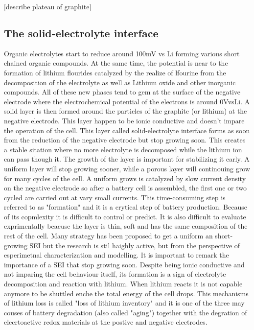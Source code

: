 [describe plateau of graphite]

\subsection{The solid-electrolyte interface}

Organic electrolytes start to reduce around 100mV vs Li forming various short chained organic compounds. At the same time, the potential is near to the formation of lithium flourides catalyzed by the realize of lfourine from the decomposition of the electrolyte as well as Lithium oxide and other inorganic compounds. All of these new phases tend to gem at the surface of the negative electrode where the electrochemical potential of the electrons is around 0VvsLi. A solid layer is then formed around the particles of the graphite (or lithium) at the negative electrode. This layer happen to be ionic conductive and doesn't impare the operation of the cell. This layer called solid-electrolyte interface forms as soon from the reduction of the negative electrode but stop growing soon. This creates a stable sitation where no more electrolyte is decomposed while the lithium ion can pass though it. The growth of the layer is important for stabilizing it early. A uniform layer will stop growing sooner, while a porous layer will continouing grow for many cycles of the cell. A uniform grows is catalyzed by slow current density on the negative electrode so after a battery cell is assembled, the first one or two cycled are carried out at vary small currents. This time-consuming step is referred to as "formation" and it is a crytical step of battery production. Because of its copmlexity it is difficult to control or predict. It is also difficult to evaluate exprimentally beacuse the layer is thin, soft and has the same composition of the rest of the cell. Many strategy has been proposed to get a uniform an short-growing SEI but the research is stil haighly active, but from the perspective of esperimetnal characterization and modelling. It is important to remark the importance of a SEI that stop growing soon. Despite being ionic conductive and not imparing the cell behaviour itself, its formation is a sign of electrolyte decomposition and reaction with lithium. When lithium reacts it is not capable anymore to be shuttled enche the total energy of the cell drops. This mechanisms of lithium loss is called "loss of lithium inventory" and it is one of the three may couses of battery degradation (also called "aging") together with the degration of elecrtoactive redox materials at the postive and negative electrodes.


